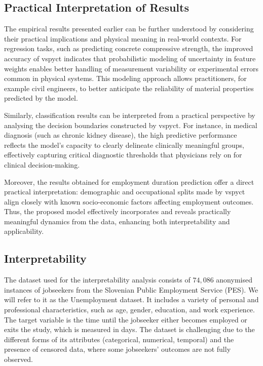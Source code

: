 \documentclass[3p,review,authoryear]{elsarticle}
\begin{document}
\subsection{Practical Interpretation of Results}
The empirical results presented earlier can be further understood by considering their practical implications and physical meaning in real-world contexts.
For regression tasks, such as predicting concrete compressive strength, the improved accuracy of \gls{vspyct} indicates that probabilistic modeling of uncertainty in feature weights enables better handling of measurement variability or experimental errors common in physical systems.
This modeling approach allows practitioners, for example civil engineers, to better anticipate the reliability of material properties predicted by the model.

Similarly, classification results can be interpreted from a practical perspective by analysing the decision boundaries constructed by \gls{vspyct}.
For instance, in medical diagnosis (such as chronic kidney disease), the high predictive performance reflects the model’s capacity to clearly delineate clinically meaningful groups, effectively capturing critical diagnostic thresholds that physicians rely on for clinical decision-making.

Moreover, the results obtained for employment duration prediction offer a direct practical interpretation: demographic and occupational splits made by \gls{vspyct} align closely with known socio-economic factors affecting employment outcomes.
Thus, the proposed model effectively incorporates and reveals practically meaningful dynamics from the data, enhancing both interpretability and applicability.

\subsection{Interpretability}

The dataset used for the interpretability analysis consists of $74,086$ anonymised instances of jobseekers from the Slovenian Public Employment Service (PES).
We will refer to it as the Unemployment dataset.
It includes a variety of personal and professional characteristics, such as age, gender, education, and work experience.
The target variable is the time until the jobseeker either becomes employed or exits the study, which is measured in days.
The dataset is challenging due to the different forms of its attributes (categorical, numerical, temporal) and the presence of censored data, where some jobseekers’ outcomes are not fully observed.
\end{document}
